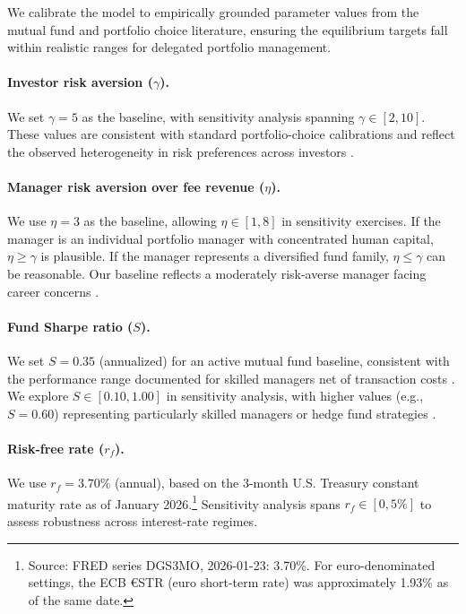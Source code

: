 \documentclass[11pt]{article}
\newcommand{\Sharpe}{S}
\begin{document}
We calibrate the model to empirically grounded parameter values from the mutual fund and portfolio choice literature, ensuring the equilibrium targets fall within realistic ranges for delegated portfolio management.

\paragraph{Investor risk aversion (\(\gamma\)).}
We set \(\gamma=5\) as the baseline, with sensitivity analysis spanning \(\gamma\in[2,10]\). These values are consistent with standard portfolio-choice calibrations \citep[][]{campbell2002strategic} and reflect the observed heterogeneity in risk preferences across investors \citep[][]{guiso2018time}.

\paragraph{Manager risk aversion over fee revenue (\(\eta\)).}
We use \(\eta=3\) as the baseline, allowing \(\eta\in[1,8]\) in sensitivity exercises. If the manager is an individual portfolio manager with concentrated human capital, \(\eta\ge\gamma\) is plausible. If the manager represents a diversified fund family, \(\eta\le\gamma\) can be reasonable. Our baseline reflects a moderately risk-averse manager facing career concerns \citep[][]{chevalier1997risk}.

\paragraph{Fund Sharpe ratio (\(\Sharpe\)).}
We set \(\Sharpe=0.35\) (annualized) for an active mutual fund baseline, consistent with the performance range documented for skilled managers net of transaction costs \citep[][]{carhart1997persistence}. We explore \(\Sharpe\in[0.10,1.00]\) in sensitivity analysis, with higher values (e.g., \(\Sharpe=0.60\)) representing particularly skilled managers or hedge fund strategies \citep[][]{fung2004hedge}.

\paragraph{Risk-free rate (\(r_f\)).}
We use \(r_f=3.70\%\) (annual), based on the 3-month U.S. Treasury constant maturity rate as of January 2026.\footnote{Source: FRED series DGS3MO, 2026-01-23: 3.70\%. For euro-denominated settings, the ECB €STR (euro short-term rate) was approximately 1.93\% as of the same date.} Sensitivity analysis spans \(r_f\in[0,5\%]\) to assess robustness across interest-rate regimes.
\end{document}
